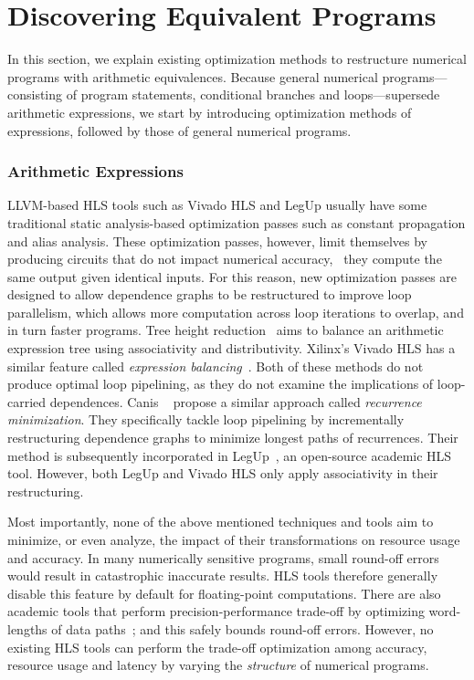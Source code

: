 \section{Discovering Equivalent Programs}
\label{bg:sec:discovering_equivalent_programs}

In this section, we explain existing optimization methods to restructure
numerical programs with arithmetic equivalences.  Because general numerical
programs---consisting of program statements, conditional branches and
loops---supersede arithmetic expressions, we start by introducing optimization
methods of expressions, followed by those of general numerical programs.


\subsubsection{Arithmetic Expressions}
\label{bg:ssub:arithmetic_expressions}

LLVM-based HLS tools such as Vivado HLS and LegUp usually have some
traditional static analysis-based optimization passes such as constant
propagation and alias analysis.  These optimization passes, however, limit
themselves by producing circuits that do not impact numerical accuracy,
\ie~they compute the same output given identical inputs.  For this reason,
new optimization passes are designed to allow dependence graphs to be
restructured to improve loop parallelism, which allows more computation
across loop iterations to overlap, and in turn faster programs.  Tree height
reduction~\cite{nicolau91} aims to balance an arithmetic expression tree using
associativity and distributivity.  Xilinx's Vivado HLS has a similar feature
called \emph{expression balancing}~\cite{vivado_hls}.  Both of these methods do
not produce optimal loop pipelining, as they do not examine the implications
of loop-carried dependences.  Canis \etal~\cite{canis14} propose a similar
approach called \emph{recurrence minimization}. They specifically tackle
loop pipelining by incrementally restructuring dependence graphs to minimize
longest paths of recurrences.  Their method is subsequently incorporated in
LegUp~\cite{legup}, an open-source academic HLS tool.  However, both LegUp and
Vivado HLS only apply associativity in their restructuring.

Most importantly, none of the above mentioned techniques and tools aim to
minimize, or even analyze, the impact of their transformations on resource
usage and accuracy. In many numerically sensitive programs, small round-off
errors would result in catastrophic inaccurate results.  HLS tools therefore
generally disable this feature by default for floating-point computations.
There are also academic tools that perform precision-performance trade-off by
optimizing word-lengths of data paths~\cite{constantinides}; and this safely
bounds round-off errors.  However, no existing HLS tools can perform the
trade-off optimization among accuracy, resource usage and latency by varying
the \emph{structure} of numerical programs.

